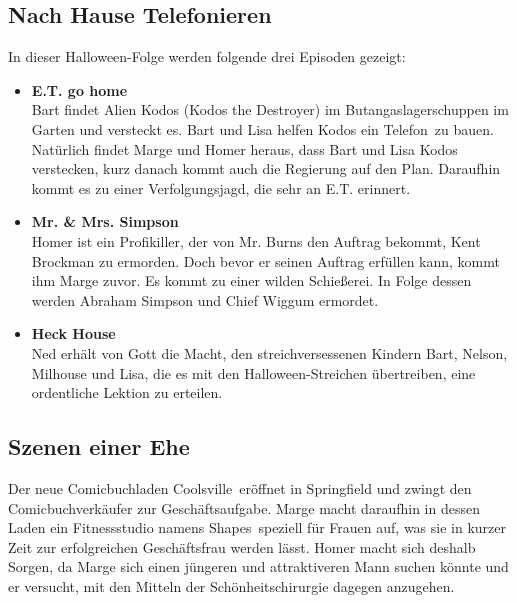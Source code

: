 \subsection{Nach Hause Telefonieren}
In dieser Halloween-Folge werden folgende drei Episoden gezeigt:
\begin{itemize}
	\item \textbf{E.T. go home}\\ Bart findet Alien Kodos (\glqq Kodos the Destroyer\grqq ) im Butangaslagerschuppen im Garten und versteckt es. Bart und Lisa helfen Kodos ein \glqq Telefon\grqq\ zu bauen. Natürlich findet Marge und Homer heraus, dass Bart und Lisa Kodos verstecken, kurz danach kommt auch die Regierung auf den Plan. Daraufhin kommt es zu einer Verfolgungsjagd, die sehr an E.T. erinnert.
	\item \textbf{Mr. \& Mrs. Simpson}\\ Homer ist ein Profikiller, der von Mr. Burns den Auftrag bekommt, Kent Brockman zu ermorden. Doch bevor er seinen Auftrag erfüllen kann, kommt ihm Marge zuvor. Es kommt zu einer wilden Schießerei. In Folge dessen werden Abraham Simpson und Chief Wiggum ermordet.
	\item \textbf{Heck House}\\ Ned erhält von Gott die Macht, den streichversessenen Kindern Bart, Nelson, Milhouse und Lisa, die es mit den Halloween-Streichen übertreiben, eine ordentliche Lektion zu erteilen. 
\end{itemize}


\subsection{Szenen einer Ehe}
Der neue Comicbuchladen \glqq Coolsville\grqq\ eröffnet in Springfield und zwingt den Comic\-buch\-ver\-käu\-fer zur Geschäftsaufgabe. Marge macht daraufhin in dessen Laden ein Fitnessstudio namens \glqq Shapes\grqq\ speziell für Frauen auf, was sie in kurzer Zeit zur erfolgreichen Geschäftsfrau werden lässt. Homer macht sich deshalb Sorgen, da Marge sich einen jüngeren und attraktiveren Mann suchen könnte und er versucht, mit den Mitteln der Schönheits\-chirurgie dagegen anzugehen. 

